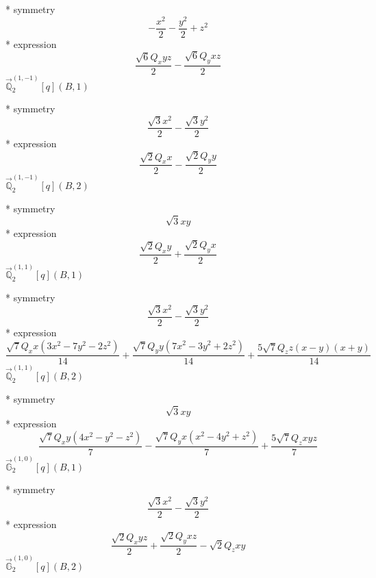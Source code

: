\documentclass[fleqn,8pt]{jsarticle}
\begin{document}
\noindent\quad ** symmetry
\begin{dmath*}
- \frac{x^{2}}{2} - \frac{y^{2}}{2} + z^{2}
\end{dmath*}
\noindent\quad ** expression
\begin{dmath*}
\frac{\sqrt{6} Q_{x} y z}{2} - \frac{\sqrt{6} Q_{y} x z}{2}
\end{dmath*}
\noindent\quad $\vec{\mathbb{Q}}_{2}^{(1,-1)}[q](B,1)$

\noindent\quad ** symmetry
\begin{dmath*}
\frac{\sqrt{3} x^{2}}{2} - \frac{\sqrt{3} y^{2}}{2}
\end{dmath*}
\noindent\quad ** expression
\begin{dmath*}
\frac{\sqrt{2} Q_{x} x}{2} - \frac{\sqrt{2} Q_{y} y}{2}
\end{dmath*}
\noindent\quad $\vec{\mathbb{Q}}_{2}^{(1,-1)}[q](B,2)$

\noindent\quad ** symmetry
\begin{dmath*}
\sqrt{3} x y
\end{dmath*}
\noindent\quad ** expression
\begin{dmath*}
\frac{\sqrt{2} Q_{x} y}{2} + \frac{\sqrt{2} Q_{y} x}{2}
\end{dmath*}
\noindent\quad $\vec{\mathbb{Q}}_{2}^{(1,1)}[q](B,1)$

\noindent\quad ** symmetry
\begin{dmath*}
\frac{\sqrt{3} x^{2}}{2} - \frac{\sqrt{3} y^{2}}{2}
\end{dmath*}
\noindent\quad ** expression
\begin{dmath*}
\frac{\sqrt{7} Q_{x} x \left(3 x^{2} - 7 y^{2} - 2 z^{2}\right)}{14} + \frac{\sqrt{7} Q_{y} y \left(7 x^{2} - 3 y^{2} + 2 z^{2}\right)}{14} + \frac{5 \sqrt{7} Q_{z} z \left(x - y\right) \left(x + y\right)}{14}
\end{dmath*}
\noindent\quad $\vec{\mathbb{Q}}_{2}^{(1,1)}[q](B,2)$

\noindent\quad ** symmetry
\begin{dmath*}
\sqrt{3} x y
\end{dmath*}
\noindent\quad ** expression
\begin{dmath*}
\frac{\sqrt{7} Q_{x} y \left(4 x^{2} - y^{2} - z^{2}\right)}{7} - \frac{\sqrt{7} Q_{y} x \left(x^{2} - 4 y^{2} + z^{2}\right)}{7} + \frac{5 \sqrt{7} Q_{z} x y z}{7}
\end{dmath*}
\noindent\quad $\vec{\mathbb{G}}_{2}^{(1,0)}[q](B,1)$

\noindent\quad ** symmetry
\begin{dmath*}
\frac{\sqrt{3} x^{2}}{2} - \frac{\sqrt{3} y^{2}}{2}
\end{dmath*}
\noindent\quad ** expression
\begin{dmath*}
\frac{\sqrt{2} Q_{x} y z}{2} + \frac{\sqrt{2} Q_{y} x z}{2} - \sqrt{2} Q_{z} x y
\end{dmath*}
\noindent\quad $\vec{\mathbb{G}}_{2}^{(1,0)}[q](B,2)$
\end{document}
